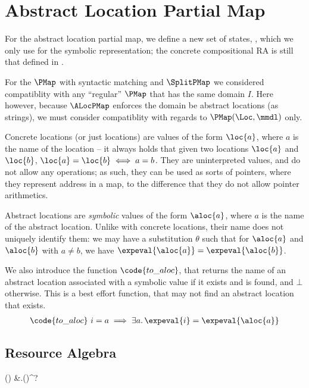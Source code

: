 \section{Abstract Location Partial Map} \label{proofs:alocpmap-soundness}

For the abstract location partial map, we define a new set of states, \ALocPMap, which we only use for the symbolic representation; the concrete compositional RA is still that defined in \PMap. 

For the $\PMap$ with syntactic matching and $\SplitPMap$ we considered compatiblity with any ``regular'' $\PMap$ that has the same domain $I$. Here however, because $\ALocPMap$ enforces the domain be abstract locations (as strings), we must consider compatiblity with regards to $\PMap(\Loc, \mmdl)$ only.

Concrete locations (or just locations) are values of the form $\loc{a}$, where $a$ is the name of the location -- it always holds that given two locations $\loc{a}$ and $\loc{b}$, $\loc{a}=\loc{b} \iff a=b$. They are uninterpreted values, and do not allow any operations; as such, they can be used as sorts of pointers, where they represent address in a map, to the difference that they do not allow pointer arithmetics.

Abstract locations are \emph{symbolic} values of the form $\aloc{a}$, where $a$ is the name of the abstract location. Unlike with concrete locations, their name does not uniquely identify them: we may have a substitution $\theta$ such that for $\aloc{a}$ and $\aloc{b}$ with $a\neq b$, we have $\expeval{\aloc{a}} = \expeval{\aloc{b}}$.

We also introduce the function $\code{to\_aloc}$, that returns the name of an abstract location associated with a symbolic value if it exists and is found, and $\bot$ otherwise. This is a best effort function, that may not find an abstract location that exists. \begin{align*}
	\code{to\_aloc}~i = a \implies \exists a\ldotp \expeval{i}=\expeval{\aloc{a}}
\end{align*}

\subsection{Resource Algebra}

\begin{breakalign*}
	\ALocPMap(\mmdl) & \Str \finmap \mmdl.\Sigma \times \pset(\LVal)^?
\end{breakalign*}

